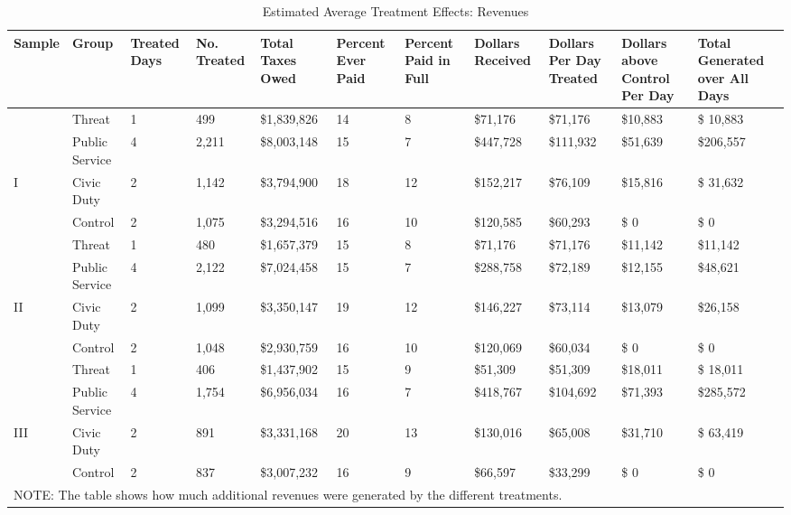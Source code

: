 \documentclass[12pt,titlepage]{article}
\begin{document}
\begin{sidewaystable}[htbp]
\caption{Estimated Average Treatment Effects: Revenues}  \label{table:summary}
\bigskip
\centering
\begin{tabular}{|p{1.3cm}|p{1.3cm}|p{1.3cm}|p{1.3cm}|p{2cm}|p{1.4cm}|p{1.4cm}|p{1.4cm}|p{1.4cm}|p{1.4cm}|p{1.6cm}|}
  \hline
Sample & Group & Treated Days & No. Treated & Total Taxes Owed & Percent Ever Paid & Percent Paid in Full & Dollars Received & Dollars Per Day Treated & Dollars above Control Per Day & Total Generated over All Days \\ 
  \hline
 & Threat & 1 & 499 & \$1,839,826 & 14 &  8 & \$71,176 & \$71,176 & \$10,883 & \$ 10,883 \\ 
   & Public Service & 4 & 2,211 & \$8,003,148 & 15 &  7 & \$447,728 & \$111,932 & \$51,639 & \$206,557 \\ 
  I & Civic Duty & 2 & 1,142 & \$3,794,900 & 18 & 12 & \$152,217 & \$76,109 & \$15,816 & \$ 31,632 \\ 
  & Control & 2 & 1,075 & \$3,294,516 & 16 & 10 & \$120,585 & \$60,293 & \$     0 & \$      0 \\ 
   \hline
 & Threat & 1 & 480 & \$1,657,379 & 15 &  8 & \$71,176 & \$71,176 & \$11,142 & \$11,142 \\ 
 & Public Service & 4 & 2,122 & \$7,024,458 & 15 &  7 & \$288,758 & \$72,189 & \$12,155 & \$48,621 \\ 
II & Civic Duty & 2 & 1,099 & \$3,350,147 & 19 & 12 & \$146,227 & \$73,114 & \$13,079 & \$26,158 \\ 
 & Control & 2 & 1,048 & \$2,930,759 & 16 & 10 & \$120,069 & \$60,034 & \$     0 & \$     0 \\ 
   \hline
 & Threat & 1 & 406 & \$1,437,902 & 15 &  9 & \$51,309 & \$51,309 & \$18,011 & \$ 18,011 \\ 
 & Public Service & 4 & 1,754 & \$6,956,034 & 16 &  7 & \$418,767 & \$104,692 & \$71,393 & \$285,572 \\ 
  III & Civic Duty & 2 & 891 & \$3,331,168 & 20 & 13 & \$130,016 & \$65,008 & \$31,710 & \$ 63,419 \\ 
 & Control & 2 & 837 & \$3,007,232 & 16 &  9 & \$66,597 & \$33,299 & \$     0 & \$      0 \\ 
   \hline
\multicolumn{11}{l}{NOTE: The table shows how much additional revenues were generated by the different treatments.} \\
\end{tabular}
\end{sidewaystable}
\end{document}

